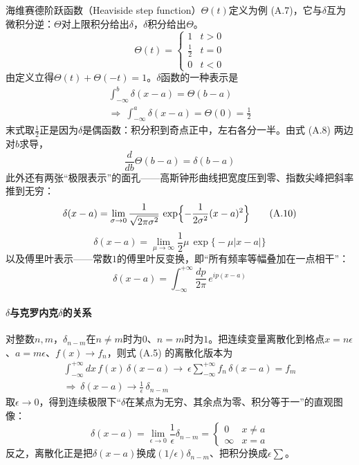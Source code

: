 海维赛德阶跃函数（Heaviside step function）$\Theta(t)$定义为例 (A.7)，它与$\delta$互为微积分逆：$\Theta$对上限积分给出$\delta$，$\delta$积分给出$\Theta$。
\begin{equation*}
\Theta(t)=
\begin{cases}
1 & t>0\\
\frac{1}{2} & t=0\\
0 & t<0
\end{cases}
\tag{A.7}
\end{equation*}
由定义立得$\Theta(t)+\Theta(-t)=1$。$\delta$函数的一种表示是
\begin{align*}
\int_{-\infty}^{b}\delta(x-a)=\Theta(b-a)
\tag{A.8}\\
\Rightarrow\ \int_{-\infty}^{a}\delta(x-a)=\Theta(0)=\frac{1}{2}
\tag{A.9}
\end{align*}
末式取$\frac{1}{2}$正是因为$\delta$是偶函数：积分积到奇点正中，左右各分一半。由式 (A.8) 两边对$b$求导，
\begin{equation*}
\frac{d}{db}\Theta(b-a)=\delta(b-a)
\end{equation*}
此外还有两张“极限表示”的面孔——高斯钟形曲线把宽度压到零、指数尖峰把斜率推到无穷：
\begin{equation*}
\delta(x-a)=\lim_{\sigma\to 0}\frac{1}{\sqrt{2\pi\sigma^2}}\,
\exp\Bigl\{-\frac{1}{2\sigma^2}(x-a)^2\Bigr\}
\tag{A.10}
\end{equation*}
\begin{equation*}
\delta(x-a)=\lim_{\mu\to\infty}\frac{1}{2}\mu\,
\exp\bigl\{-\mu|x-a|\bigr\}
\end{equation*}
以及傅里叶表示——常数$1$的傅里叶反变换，即“所有频率等幅叠加在一点相干”：
\begin{equation*}
\delta(x-a)=\int_{-\infty}^{+\infty}\frac{dp}{2\pi}\,e^{ip(x-a)}
\tag{A.11}
\end{equation*}

\paragraph{$\delta$与克罗内克$\delta$的关系}
对整数$n,m$，$\delta_{n-m}$在$n\ne m$时为$0$、$n=m$时为$1$。把连续变量离散化到格点$x=n\epsilon$、$a=m\epsilon$、$f(x)\to f_n$，则式 (A.5) 的离散化版本为
\begin{align*}
\int_{-\infty}^{+\infty}dx\,f(x)\,\delta(x-a)
\to\ \epsilon\sum_{-\infty}^{+\infty}f_n\,\delta(x-a)=f_m\\
\Rightarrow\ \delta(x-a)\to\frac{1}{\epsilon}\,\delta_{n-m}
\tag{A.13}
\end{align*}
取$\epsilon\to 0$，得到连续极限下“$\delta$在某点为无穷、其余点为零、积分等于一”的直观图像：
\begin{equation*}
\delta(x-a)=\lim_{\epsilon\to 0}\frac{1}{\epsilon}\delta_{n-m}
=
\begin{cases}
0 & x\ne a\\
\infty & x=a
\end{cases}
\end{equation*}
反之，离散化正是把$\delta(x-a)$换成$(1/\epsilon)\delta_{n-m}$、把积分换成$\epsilon\sum$。

